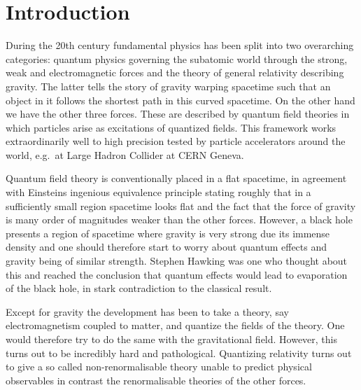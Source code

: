 \chapter{Introduction}
During the 20th century fundamental physics has been split into two overarching categories: quantum physics governing the subatomic world through the strong, weak and electromagnetic forces and the theory of general relativity describing gravity. The latter tells the story of gravity warping spacetime such that an object in it follows the shortest path in this curved spacetime. On the other hand we have the other three forces. These are described by quantum field theories in which particles arise as excitations of quantized fields. This framework works extraordinarily well to high precision tested by particle accelerators around the world, e.g.\ at Large Hadron Collider at CERN Geneva.


Quantum field theory is conventionally placed in a flat spacetime, in agreement with Einsteins ingenious equivalence principle stating roughly that in a sufficiently small region spacetime looks flat and the fact that the force of gravity is many order of magnitudes weaker than the other forces. However, a black hole presents a region of spacetime where gravity is very strong due its immense density and one should therefore start to worry about quantum effects and gravity being of similar strength. Stephen Hawking was one who thought about this and reached the conclusion that quantum effects would lead to evaporation of the black hole, in stark contradiction to the classical result.

Except for gravity the development has been to take a theory, say electromagnetism coupled to matter, and quantize the fields of the theory. One would therefore try to do the same with the gravitational field. However, this turns out to be incredibly hard and pathological. Quantizing relativity turns out to give a so called non-renormalisable theory unable to predict physical observables in contrast the renormalisable theories of the other forces. 

